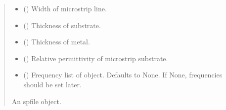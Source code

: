 \documentclass[letterpaper,10pt,english]{sphinxmanual}
\begin{document}
\begin{fulllineitems}
\begin{fulllineitems}
\begin{quote}
\begin{description}
\begin{itemize}
\item {} 
\sphinxAtStartPar
{} () \textendash{} Width of microstrip line.

\item {} 
\sphinxAtStartPar
{} () \textendash{} Thickness of substrate.

\item {} 
\sphinxAtStartPar
{} () \textendash{} Thickness of metal.

\item {} 
\sphinxAtStartPar
{} () \textendash{} Relative permittivity of microstrip substrate.

\item {} 
\sphinxAtStartPar
{} (\sphinxstyleliteralemphasis{\sphinxupquote{, }}) \textendash{} Frequency list of object. Defaults to None. If None, frequencies should be set later.

\end{itemize}

\sphinxAtStartPar
An spfile object.

\sphinxAtStartPar
{\hyperref[\detokenize{touchstone:touchstone.spfile}]{}}

\end{description}\end{quote}

\end{fulllineitems}



\end{fulllineitems}
\end{document}
